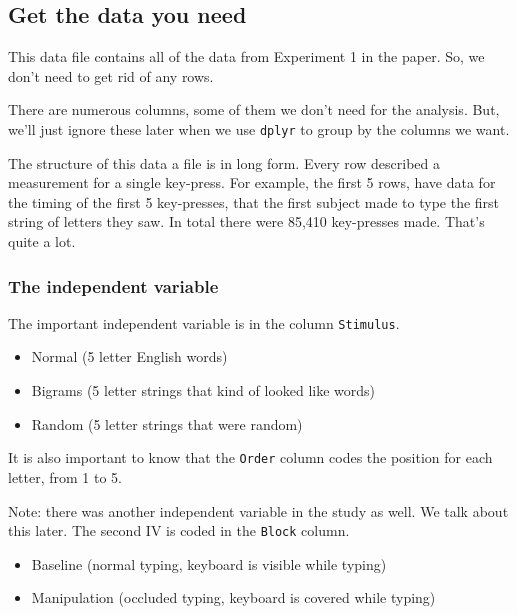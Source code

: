 \documentclass[
]{book}
\providecommand{\tightlist}{%
  \setlength{\itemsep}{0pt}\setlength{\parskip}{0pt}}
\begin{document}
\hypertarget{get-the-data-you-need-1}{%
\subsection{Get the data you need}\label{get-the-data-you-need-1}}

This data file contains all of the data from Experiment 1 in the paper. So, we don't need to get rid of any rows.

There are numerous columns, some of them we don't need for the analysis. But, we'll just ignore these later when we use \texttt{dplyr} to group by the columns we want.

The structure of this data a file is in long form. Every row described a measurement for a single key-press. For example, the first 5 rows, have data for the timing of the first 5 key-presses, that the first subject made to type the first string of letters they saw. In total there were 85,410 key-presses made. That's quite a lot.

\hypertarget{the-independent-variable-1}{%
\subsubsection{The independent variable}\label{the-independent-variable-1}}

The important independent variable is in the column \texttt{Stimulus}.

\begin{itemize}
\tightlist
\item
  Normal (5 letter English words)
\item
  Bigrams (5 letter strings that kind of looked like words)
\item
  Random (5 letter strings that were random)
\end{itemize}

It is also important to know that the \texttt{Order} column codes the position for each letter, from 1 to 5.

Note: there was another independent variable in the study as well. We talk about this later. The second IV is coded in the \texttt{Block} column.

\begin{itemize}
\tightlist
\item
  Baseline (normal typing, keyboard is visible while typing)
\item
  Manipulation (occluded typing, keyboard is covered while typing)
\end{itemize}
\end{document}
